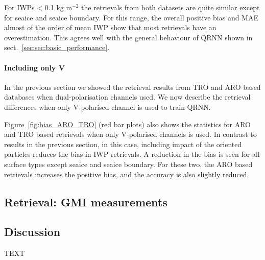 \documentclass[amt, manuscript]{copernicus}
\begin{document}
For IWPs < 0.1\,\,kg m$^{-2}$ the retrievals from both datasets are quite similar except for seaice and seaice boundary. For this range, the overall positive bias and MAE almost of the order of mean IWP show that most retrievals have an overestimation. This agrees well with the general behaviour of QRNN shown in sect.~\ref{sec:sec:basic_performance}.  

 

\paragraph{Including only V}
\label{sec:results_v}

In the previous section we showed the retrieval results from TRO and ARO based databases when dual-polarisation channels used. We now describe the retrieval differences when only V-polarised channel is used to train QRNN. 

Figure~\ref{fig:bias_ARO_TRO} (red bar plots) also shows the statistics for ARO and TRO based retrievals when only V-polarised channels is used. In contrast to results in the previous section, in this case, including impact of the oriented particles reduces the bias in IWP retrievals. A reduction in the bias is seen for all surface types except seaice and seaice boundary. For these two, the ARO based retrievals increases the positive bias, and the accuracy is also slightly reduced.

\subsection{Retrieval: GMI measurements}








\subsection{Discussion}



\conclusions  %
TEXT


\end{document}
